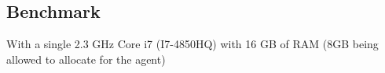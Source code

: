 \documentclass[Main]{subfiles}
\begin{document}
\subsection{Benchmark}

With a single 2.3 GHz Core i7 (I7-4850HQ) with 16 GB of RAM (8GB being allowed to allocate for the agent)
\end{document}
